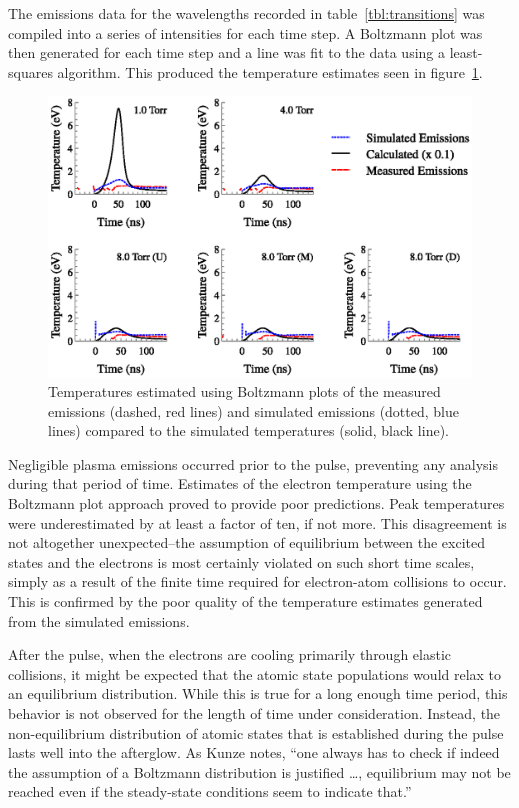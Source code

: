 The emissions data for the wavelengths recorded in table~\ref{tbl:transitions}
was compiled into a series of intensities for each time step. A Boltzmann plot
was then generated for each time step and a line was fit to the data using a
least-squares algorithm. This produced the temperature estimates seen in
figure~\ref{fig:boltcomp}.
\begin{figure}
  \centering
  \includegraphics{./chapters/emissions/figures/boltcomp.eps}
  \caption{Temperatures estimated using Boltzmann plots of the measured emissions
    (dashed, red lines) and simulated emissions (dotted, blue lines) compared to
    the simulated temperatures (solid, black line).}
  \label{fig:boltcomp}
\end{figure}
Negligible plasma emissions occurred prior to the pulse, preventing any analysis
during that period of time. Estimates of the electron temperature using the
Boltzmann plot approach proved to provide poor predictions. Peak temperatures
were underestimated by at least a factor of ten, if not more. This disagreement
is not altogether unexpected--the assumption of equilibrium between the excited
states and the electrons is most certainly violated on such short time scales,
simply as a result of the finite time required for electron-atom collisions to
occur. This is confirmed by the poor quality of the temperature estimates
generated from the simulated emissions.

After the pulse, when the electrons are cooling primarily through elastic
collisions, it might be expected that the atomic state populations would relax
to an equilibrium distribution. While this is true for a long enough time
period, this behavior is not observed for the length of time under
consideration. Instead, the non-equilibrium distribution of atomic states that
is established during the pulse lasts well into the afterglow. As Kunze notes,
``one always has to check if indeed the assumption of a Boltzmann distribution
is justified \ldots, equilibrium may not be reached even if the steady-state
conditions seem to indicate that.'' \cite{Kunze2009}


